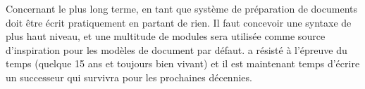 Concernant le plus long terme, \latexx en tant que système de préparation de
documents doit être écrit pratiquement en partant de rien. Il faut concevoir
une syntaxe de plus haut niveau, et une multitude de modules sera utilisée
comme source d'inspiration pour les modèles de document par défaut. \latexe a
résisté à l'épreuve du temps (quelque 15 ans et toujours bien vivant) et il
est maintenant temps d'écrire un successeur qui survivra pour les prochaines
décennies.

\lnewsend


